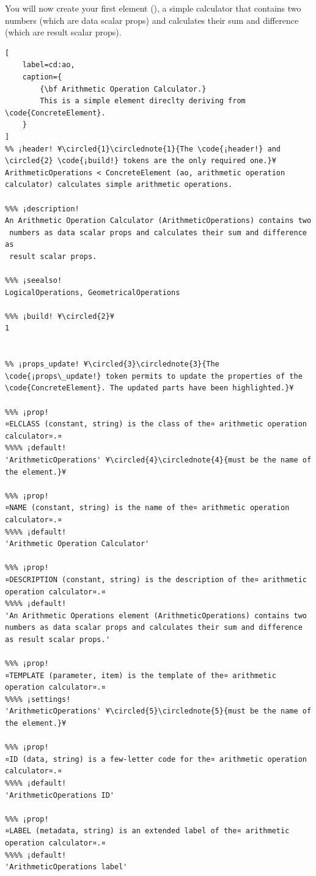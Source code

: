\documentclass{tufte-handout}
\begin{document}
You will now create your first element (), a simple calculator that contains two numbers (which are data scalar props) and calculates their sum and difference (which are result scalar props).

\begin{lstlisting}[
	label=cd:ao,
	caption={
		{\bf Arithmetic Operation Calculator.}
		This is a simple element direclty deriving from \code{ConcreteElement}.
	}
]
%% ¡header! ¥\circled{1}\circlednote{1}{The \code{¡header!} and \circled{2} \code{¡build!} tokens are the only required one.}¥
ArithmeticOperations < ConcreteElement (ao, arithmetic operation calculator) calculates simple arithmetic operations.

%%% ¡description!
An Arithmetic Operation Calculator (ArithmeticOperations) contains two 
 numbers as data scalar props and calculates their sum and difference as 
 result scalar props.

%%% ¡seealso!
LogicalOperations, GeometricalOperations

%%% ¡build! ¥\circled{2}¥
1


%% ¡props_update! ¥\circled{3}\circlednote{3}{The \code{¡props\_update!} token permits to update the properties of the \code{ConcreteElement}. The updated parts have been highlighted.}¥

%%% ¡prop!
¤ELCLASS (constant, string) is the class of the¤ arithmetic operation calculator¤.¤
%%%% ¡default!
'ArithmeticOperations' ¥\circled{4}\circlednote{4}{must be the name of the element.}¥

%%% ¡prop!
¤NAME (constant, string) is the name of the¤ arithmetic operation calculator¤.¤
%%%% ¡default!
'Arithmetic Operation Calculator'

%%% ¡prop!
¤DESCRIPTION (constant, string) is the description of the¤ arithmetic operation calculator¤.¤
%%%% ¡default!
'An Arithmetic Operations element (ArithmeticOperations) contains two numbers as data scalar props and calculates their sum and difference as result scalar props.'

%%% ¡prop!
¤TEMPLATE (parameter, item) is the template of the¤ arithmetic operation calculator¤.¤
%%%% ¡settings!
'ArithmeticOperations' ¥\circled{5}\circlednote{5}{must be the name of the element.}¥

%%% ¡prop!
¤ID (data, string) is a few-letter code for the¤ arithmetic operation calculator¤.¤
%%%% ¡default!
'ArithmeticOperations ID'

%%% ¡prop!
¤LABEL (metadata, string) is an extended label of the¤ arithmetic operation calculator¤.¤
%%%% ¡default!
'ArithmeticOperations label'


\end{lstlisting}
\end{document}
